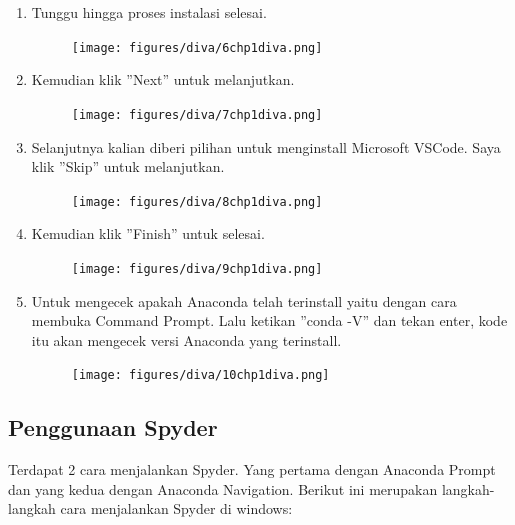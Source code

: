\begin{enumerate}
	\item Tunggu hingga proses instalasi selesai.
	\begin{figure}[H]
		\texttt{[image: figures/diva/6chp1diva.png]}
		\centering
	\end{figure}

	\item Kemudian klik ''Next'' untuk melanjutkan.
	\begin{figure}[H]
		\texttt{[image: figures/diva/7chp1diva.png]}
		\centering
	\end{figure}

	\item Selanjutnya kalian diberi pilihan untuk menginstall Microsoft VSCode. Saya klik ''Skip'' untuk melanjutkan.
	\begin{figure}[H]
		\texttt{[image: figures/diva/8chp1diva.png]}
		\centering
	\end{figure}

	\item Kemudian klik ''Finish'' untuk selesai.
	\begin{figure}[H]
		\texttt{[image: figures/diva/9chp1diva.png]}
		\centering
	\end{figure}

	\item Untuk mengecek apakah Anaconda telah terinstall yaitu dengan cara membuka Command Prompt. Lalu ketikan ''conda -V'' dan tekan enter, kode itu akan mengecek versi Anaconda yang terinstall.
	\begin{figure}[H]
		\texttt{[image: figures/diva/10chp1diva.png]}
		\centering
	\end{figure}

\end{enumerate}

\subsection{Penggunaan Spyder}

Terdapat 2 cara menjalankan Spyder. Yang pertama dengan Anaconda Prompt dan yang kedua dengan Anaconda Navigation. Berikut ini merupakan langkah-langkah cara menjalankan Spyder di windows:


